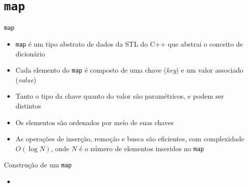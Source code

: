 \section{\texttt{map}}

\begin{frame}[fragile]{\texttt{map}}

    \begin{itemize}
        \item \texttt{map} é um tipo abstrato de dados da STL do C++ que abstrai o conceito de
            dicionário

        \item Cada elemento do \texttt{map} é composto de uma chave (\textit{key}) e um valor
            associado (\textit{value})

        \item Tanto o tipo da chave quanto do valor são paramétricos, e podem ser distintos

        \item Os elementos são ordenados por meio de suas chaves

        \item As operações de inserção, remoção e busca são eficientes, com complexidade
            $O(\log N)$, onde $N$ é o número de elementos inseridos no \texttt{map}
    \end{itemize}

\end{frame}

\begin{frame}[fragile]{Construção de um \texttt{map}}

    \begin{itemize}
        \item
    \end{itemize}

\end{frame}
